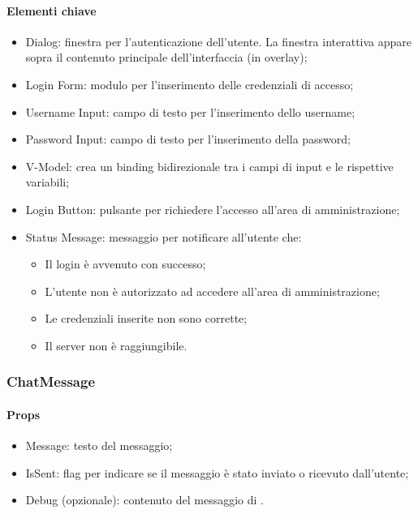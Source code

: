 \paragraph*{Elementi chiave}
\begin{itemize}
  \item Dialog: finestra per l'autenticazione dell'utente. La finestra interattiva appare sopra il contenuto principale dell'interfaccia (in overlay);
  \item Login Form: modulo per l'inserimento delle credenziali di accesso;
  \item Username Input: campo di testo per l'inserimento dello username;
  \item Password Input: campo di testo per l'inserimento della password;
  \item V-Model: crea un binding bidirezionale tra i campi di input e le rispettive variabili;
  \item Login Button: pulsante per richiedere l'accesso all'area di amministrazione;
  \item Status Message: messaggio per notificare all'utente che:
  \begin{itemize}
    \item Il login è avvenuto con successo;
    \item L'utente non è autorizzato ad accedere all'area di amministrazione;
    \item Le credenziali inserite non sono corrette;
    \item Il server non è raggiungibile.
  \end{itemize}
\end{itemize}

\subsubsection{ChatMessage}

\paragraph*{Props}
\begin{itemize}
  \item Message: testo del messaggio;
  \item IsSent: flag per indicare se il messaggio è stato inviato o ricevuto dall'utente;
  \item Debug (opzionale): contenuto del messaggio di .
\end{itemize}

